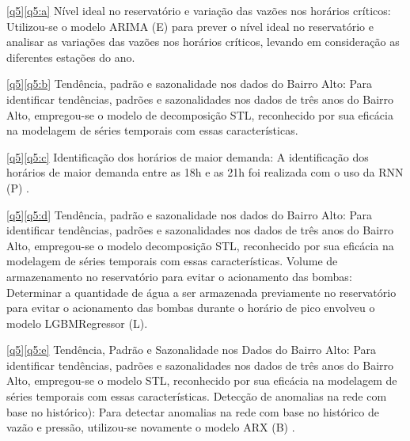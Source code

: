 \ref{q5}\eqref{q5:a} Nível ideal no reservatório e variação das vazões nos horários críticos: Utilizou-se o modelo ARIMA (E) \cite{2-s2.0-85069459067} para prever o nível ideal no reservatório e analisar as variações das vazões nos horários críticos, levando em consideração as diferentes estações do ano.

\ref{q5}\eqref{q5:b} Tendência, padrão e sazonalidade nos dados do Bairro Alto: Para identificar tendências, padrões e sazonalidades nos dados de três anos do Bairro Alto, empregou-se o modelo de decomposição STL, reconhecido por sua eficácia na modelagem de séries temporais com essas características.

\ref{q5}\eqref{q5:c} Identificação dos horários de maior demanda: A identificação dos horários de maior demanda entre as 18h e as 21h foi realizada com o uso da RNN (P) \cite{2-s2.0-85067419084}.

\ref{q5}\eqref{q5:d} Tendência, padrão e sazonalidade nos dados do Bairro Alto: Para identificar tendências, padrões e sazonalidades nos dados de três anos do Bairro Alto, empregou-se o modelo decomposição STL, reconhecido por sua eficácia na modelagem de séries temporais com essas características. Volume de armazenamento no reservatório para evitar o acionamento das bombas: Determinar a quantidade de água a ser armazenada previamente no reservatório para evitar o acionamento das bombas durante o horário de pico envolveu o modelo LGBMRegressor (L).

\ref{q5}\eqref{q5:e} Tendência, Padrão e Sazonalidade nos Dados do Bairro Alto: Para identificar tendências, padrões e sazonalidades nos dados de três anos do Bairro Alto, empregou-se o modelo STL, reconhecido por sua eficácia na modelagem de séries temporais com essas características. Detecção de anomalias na rede com base no histórico): Para detectar anomalias na rede com base no histórico de vazão e pressão, utilizou-se novamente o modelo ARX (B) \cite{2-s2.0-85051469381}.










